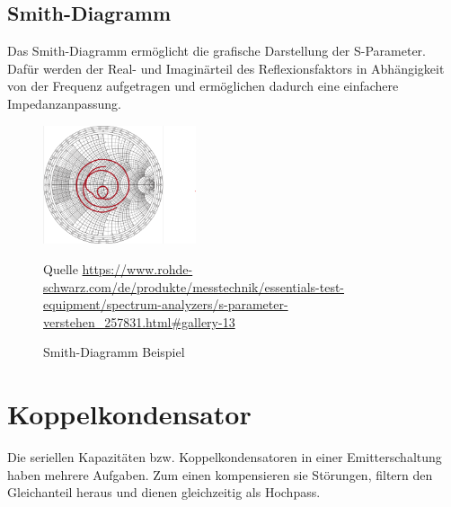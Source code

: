\subsection{Smith-Diagramm}
Das Smith-Diagramm ermöglicht die grafische Darstellung der S-Parameter.
Dafür werden der Real- und Imaginärteil des Reflexionsfaktors in Abhängigkeit von der Frequenz
aufgetragen und ermöglichen dadurch eine einfachere Impedanzanpassung.
\begin{figure}[h]
    \centering
    \includegraphics[width=0.4\textwidth]{Pictures/SmithDiagram.png}
    \caption{Smith-Diagramm Beispiel}
    \footnotesize{Quelle \url{https://www.rohde-schwarz.com/de/produkte/messtechnik/essentials-test-equipment/spectrum-analyzers/s-parameter-verstehen_257831.html#gallery-13}}
\end{figure}
\section{Koppelkondensator}
Die seriellen Kapazitäten bzw. Koppelkondensatoren in einer Emitterschaltung haben mehrere Aufgaben. Zum einen kompensieren sie Störungen, filtern den Gleichanteil
heraus und dienen gleichzeitig als Hochpass.
\clearpage